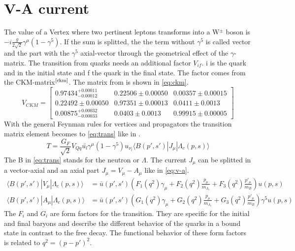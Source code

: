 \section{V-A current}
The value of a Vertex where two pertinent leptons transforms into a  
W\(^\pm\) boson is \(-i \frac{g}{2\sqrt{2}} \gamma^\mu\left(1-\gamma^5\right)\).
If the sum is splitted, the the term without \(\gamma^5\) is called vector and 
the part with the \(\gamma^5\) axial-vector through the geometrical effect of 
the \(\gamma\)-matrix. The transition from quarks needs an additional factor 
\(V_{if}\). i is the quark and in the initial state and f the quark in the 
final state. The factor comes from the CKM-matrix\(^{\text{\cite{ckm}}}\). The 
matrix from {\cite{ckm}} is shown in {\eqref{eq:ckm}}.
\begin{equation}
  V_{CKM} =
  \begin{bmatrix}
    0.97434^{+0.00011}_{-0.00012} &  0.22506 \pm 0.00050 & 0.00357 \pm 0.00015 \\
    0.22492 \pm 0.00050 & 0.97351 \pm 0.00013 & 0.0411 \pm 0.0013 \\
    0.00875^{+0.00032}_{-0.00033} & 0.0403 \pm 0.0013 & 0.99915 \pm 0.00005
  \end{bmatrix} \label{eq:ckm}
\end{equation}
With the general Feynman rules for vertices and propagators the transition matrix 
element becomes to {\eqref{eq:trans}} like in {\cite[Eq. 1]{Frank}}.
\begin{equation}
  T = \frac{G_F}{\sqrt{2}} V_{Qq} \bar{u_l}\gamma^\mu\left(1 - \gamma^5\right) 
  u_{\nu_l} \langle B(p', s') | J_\mu | \Lambda_c(p, s) \rangle \label{eq:trans}
\end{equation}
The B in {\eqref{eq:trans}} stands for the neutron or \(\Lambda\). The current 
\(J_\mu\) can be splitted in a vector-axial and an axial part \(J_\mu = V_\mu - 
A_\mu \) like in {\eqref{eq:v-a}}.
\begin{align}
  \langle B(p', s') | V_\mu | \Lambda_c(p, s) \rangle & = \bar{u}(p', s') 
  \left( F_1(q^2) \gamma_\mu + F_2(q^2)\frac{p_\mu}{m_{\Lambda_c}} + 
  F_3(q^2)\frac{p'_\mu}{m_B} \right) u(p, s) \nonumber \\
  \langle B(p', s') | A_\mu | \Lambda_c(p, s) \rangle & = \bar{u}(p', s') 
  \left( G_1(q^2) \gamma_\mu + G_2(q^2)\frac{p_\mu}{m_{\Lambda_c}} + 
  G_3(q^2)\frac{p'_\mu}{m_B} \right) \gamma^5 u(p, s) \label{eq:v-a}
\end{align}
The \(F_i\) and \(G_i\) are form factors for the transition. They are specific 
for the initial and final baryons and describe the different behavior of the 
quarks in a bound state in contrast to the free decay. The functional behavior 
of these form factors is related to \(q^2 = (p - p')^2\).

